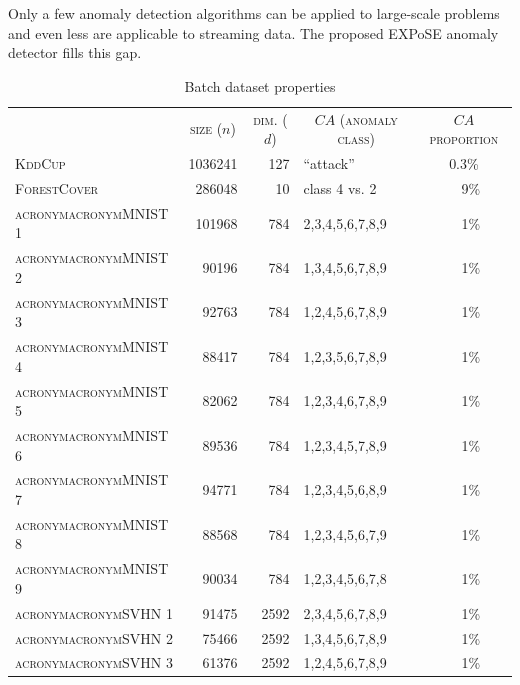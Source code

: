 Only a few anomaly detection algorithms can be applied to large-scale problems and even less are applicable to streaming data. The proposed EXPoSE anomaly detector fills this gap.

\begin{table}[p]
	\caption{Batch dataset properties}
\begin{center}
	\small
	\begin{tabular}{lrrlc}
		\toprule 
		\addlinespace
		& \multicolumn{1}{c}{\textsc{size ($n$)}}  & \multicolumn{1}{c}{\textsc{dim. ($d$)}} & \multicolumn{1}{c}{\textsc{$CA$ (anomaly class)}} & \multicolumn{1}{c}{\textsc{$CA$ proportion}} \\ 
		\cmidrule(lr){2-2}\cmidrule(lr){3-3}\cmidrule(lr){4-4}\cmidrule(lr){5-5}
		\addlinespace
		\textsc{\textsc{KddCup}} & \num{1036241} & \num{127} & \enquote{attack}& 0.3\%\\
		\textsc{ForestCover} & \num{286048} & \num{10} & class 4 vs. 2 & ~~9\%\\
		\textsc{acronym{acronym{MNIST}} 1}	& \num{101968}	& \num{784} & 2,3,4,5,6,7,8,9 & ~~1\%\\
		\textsc{acronym{acronym{MNIST}} 2}	& \num{90196}	& \num{784} & 1,3,4,5,6,7,8,9 & ~~1\%\\
		\textsc{acronym{acronym{MNIST}} 3}	& \num{92763}	& \num{784} & 1,2,4,5,6,7,8,9 & ~~1\%\\
		\textsc{acronym{acronym{MNIST}} 4}	& \num{88417}	& \num{784} & 1,2,3,5,6,7,8,9 & ~~1\%\\
		\textsc{acronym{acronym{MNIST}} 5}	& \num{82062}	& \num{784} & 1,2,3,4,6,7,8,9 & ~~1\%\\
		\textsc{acronym{acronym{MNIST}} 6}	& \num{89536}	& \num{784} & 1,2,3,4,5,7,8,9 & ~~1\%\\
		\textsc{acronym{acronym{MNIST}} 7}	& \num{94771}	& \num{784} & 1,2,3,4,5,6,8,9 & ~~1\%\\
		\textsc{acronym{acronym{MNIST}} 8}	& \num{88568}	& \num{784} & 1,2,3,4,5,6,7,9 & ~~1\%\\
		\textsc{acronym{acronym{MNIST}} 9}	& \num{90034}	& \num{784} & 1,2,3,4,5,6,7,8 & ~~1\%\\
		\textsc{acronym{acronym{SVHN}} 1}	& \num{91475}	& \num{2592} & 2,3,4,5,6,7,8,9 & ~~1\%\\
		\textsc{acronym{acronym{SVHN}} 2}	& \num{75466}	& \num{2592} & 1,3,4,5,6,7,8,9 & ~~1\%\\
		\textsc{acronym{acronym{SVHN}} 3}	& \num{61376}	& \num{2592} & 1,2,4,5,6,7,8,9 & ~~1\%\\

\end{tabular}
\end{center}
\end{table}
